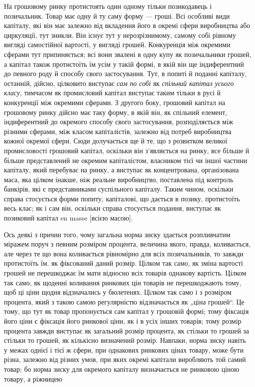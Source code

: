 На грошовому ринку протистоять один одному тільки позикодавець
і позичальник. Товар має одну й ту саму форму —
гроші. Всі особливі види капіталу, які він має залежно від
вкладення його в окремі сфери виробництва або циркуляції,
тут зникли. Він існує тут у нерозрізнимому, самому собі рівному
вигляді самостійної вартості, у вигляді грошей. Конкуренція між
окремими сферами тут припиняється; всі вони звалені в одну купу
як позичальники грошей, а капітал також протистоїть їм усім
у такій формі, в якій він ще індиферентний до певного роду й способу
свого застосування. Тут, в попиті й поданні капіталу, останній,
дійсно, цілковито виступає \emph{сам по собі} як \emph{спільний капітал
усього класу}, тимчасом як промисловий капітал виступає
таким тільки в русі й конкуренції між окремими сферами.
З другого боку, грошовий капітал на грошовому ринку дійсно
має таку форму, в якій він, як спільний елемент, індиферентний до
окремого способу свого застосування, розподіляється між різними
сферами, між класом капіталістів, залежно від потреб
виробництва кожної окремої сфери. Сюди долучається ще й те,
що з розвитком великої промисловості грошовий капітал, оскільки
він з’являється на ринку, все більше й більше представлений не
окремим капіталістом, власником тієї чи іншої частини капіталу,
який перебуває на ринку, а виступає як концентрована,
організована маса, яка цілком інакше, ніж реальне виробництво,
поставлена під контроль банкірів, які є представниками суспільного
капіталу. Таким чином, оскільки справа стосується форми попиту,
капіталові, що дається в позику, протистоїть весь клас;
як і сам він, оскільки справа стосується подання, виступає як
позиковий капітал en masse [всією масою].

Ось деякі з причин того, чому загальна норма зиску здається
розпливчатим міражем поруч з певним розміром процента, величина
якого, правда, коливається, але через те що вона коливається
рівномірно для всіх позичальників, то завжди протистоїть
їм. як фіксований даний розмір. Цілком так само, як
зміна вартості грошей не перешкоджає їм мати відносно всіх
товарів однакову вартість. Цілком так само, як щоденні коливання
ринкових цін товарів не перешкоджають тому, щоб ці ціни
щодня відзначались у бюлетенях. Цілком так само і з розміром
процента, який з такою самою регулярністю відзначається як
„ціна грошей“. Це тому, що тут як товар пропонується сам
капітал у грошовій формі; тому фіксація його ціни є фіксація
його ринкової ціни, як і в усіх інших товарів; тому розмір процента
завжди виступає як загальний розмір процента, як
стільки то грошей за стільки то грошей, як кількісно визначений
розмір. Навпаки, норма зиску навіть у межах однієї
і тієї ж сфери, при однакових ринкових цінах товару, може
бути різна, залежно від різних умов, при яких окремі капітали
виробляють той самий товар; бо норма зиску для окремого
капіталу визначається не ринковою ціною товару, а ріжницею
\parbreak{}  %
